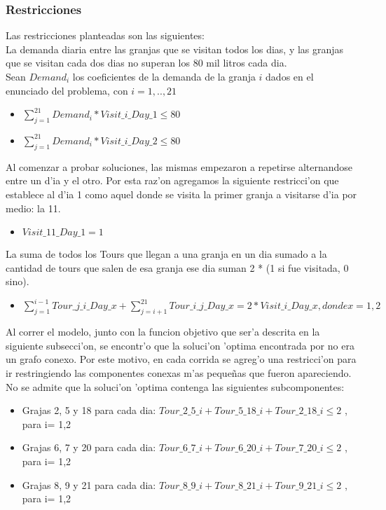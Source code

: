 \subsubsection{Restricciones}
Las restricciones planteadas son las siguientes: \\
La demanda diaria entre las granjas que se visitan todos los dias, y las granjas que se visitan cada dos dias no superan los 80 mil litros cada dia.\\
Sean $Demand_i$ los coeficientes de la demanda de la granja $i$ dados en el enunciado del problema, con $i= 1,..,21$
\begin{itemize}
\item $\sum_{j=1}^{21} Demand_i * Visit\_i\_Day\_1 \leq 80$
\item $\sum_{j=1}^{21} Demand_i * Visit\_i\_Day\_2 \leq 80$
\end{itemize}
Al comenzar a probar soluciones, las mismas empezaron a repetirse alternandose entre un d'ia y el otro. Por esta raz'on agregamos la siguiente restricci'on que establece al d'ia 1 como aquel donde se visita la primer granja a visitarse d'ia por medio: la 11.
\begin{itemize}
\item $ Visit\_11\_Day\_1 = 1$
\end{itemize}
La suma de todos los Tours que llegan a una granja en un dia sumado a la cantidad de tours que salen de esa granja ese dia suman 2 * (1 si fue visitada, 0 sino).
\begin{itemize}
\item $ \sum_{j = 1}^{i-1} Tour\_j\_i\_Day\_x + \sum_{j=i+1}^{21} Tour\_i\_j\_Day\_x = 2 * Visit\_i\_Day\_x            , donde	x = 1,2 $
\end{itemize}
Al correr el modelo, junto con la funcion objetivo que ser'a descrita en la siguiente subsecci'on, se encontr'o que la soluci'on 'optima encontrada por no era un grafo conexo. Por este motivo, en cada corrida se agreg'o una restricci'on para ir restringiendo las componentes conexas m'as peque\~nas que fueron apareciendo. \\
No se admite que la soluci'on 'optima contenga las siguientes subcomponentes:
\begin{itemize}
\item Grajas 2, 5 y 18 para cada dia: $Tour\_2\_5\_i + Tour\_5\_18\_i + Tour\_2\_18\_i \leq 2$ , para i= 1,2
\item Grajas 6, 7 y 20 para cada dia: $Tour\_6\_7\_i + Tour\_6\_20\_i + Tour\_7\_20\_i \leq 2$ , para i= 1,2
\item Grajas 8, 9 y 21 para cada dia: $Tour\_8\_9\_i + Tour\_8\_21\_i + Tour\_9\_21\_i \leq 2$ , para i= 1,2
\end{itemize}
